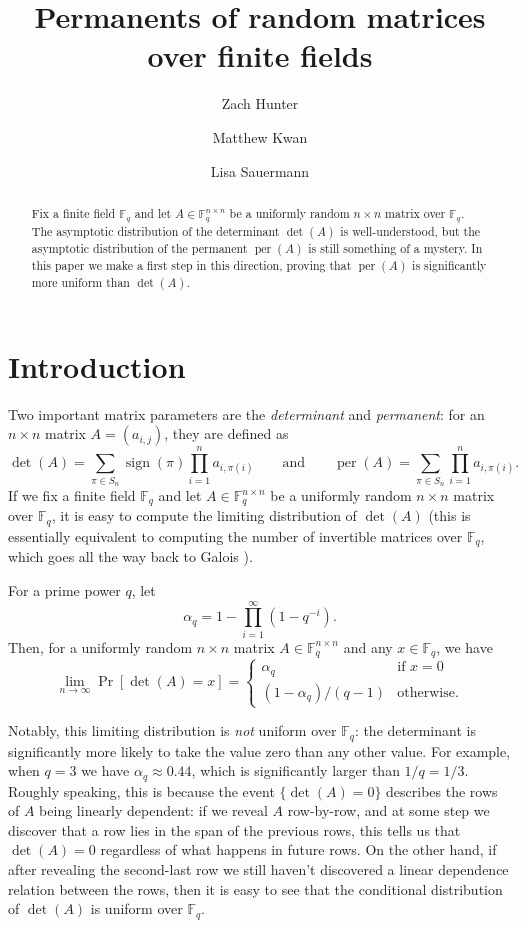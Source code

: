 \documentclass[10pt,reqno]{amsart}
\title{Permanents of random matrices over finite fields}
\author[A1]{Zach Hunter}
\author[A2]{Matthew Kwan}
\author[A3]{Lisa Sauermann}
\let\originalleft\left
\let\originalright\right
\renewcommand{\left}{\mathopen{}\mathclose\bgroup\originalleft}
\renewcommand{\right}{\aftergroup\egroup\originalright}
\numberwithin{equation}{section}
\theoremstyle{remark}
\newcommand{\mb}{\mathbb}
\newcommand{\on}{\operatorname}
\begin{document}
\begin{abstract} 
Fix a finite field $\mb F_q$ and let $A\in \mb F_q^{n\times n}$ be a uniformly random $n\times n$ matrix over $\mb F_q$. The asymptotic distribution of the determinant $\det(A)$ is well-understood, but the asymptotic distribution of the permanent $\on{per}(A)$ is still something of a mystery. In this paper we make a first step in this direction, proving that $\on{per}(A)$ is significantly more uniform than $\on{det}(A)$.
\end{abstract}

\maketitle

\section{Introduction}\label{sec:introduction}
Two important matrix parameters are the \emph{determinant}
and \emph{permanent}: for an $n\times n$ matrix $A=(a_{i,j})$, 
they are defined as
\begin{equation}
\det(A)=\sum_{\pi\in S_{n}}\operatorname{sign}(\pi)\prod_{i=1}^{n}a_{i,\pi(i)}\qquad\text{and}\qquad\operatorname{per}(A)=\sum_{\pi\in S_{n}}\prod_{i=1}^{n}a_{i,\pi(i)}.\label{eq:det-per}
\end{equation}
If we fix a finite field $\mb F_q$ and let $A\in \mb F_q^{n\times n}$ be a uniformly random $n\times n$ matrix over $\mb F_q$, it is easy to compute the limiting distribution of $\det(A)$ (this is essentially equivalent to computing the number of invertible matrices over $\mb F_q$, which goes all the way back to Galois \cite[p.\ 280]{Smith-book}).
\begin{fact}\label{fact:det}
For a prime power $q$, let 
\[
\alpha_{q}=1-\prod_{i=1}^{\infty}(1-q^{-i}).%
\]
Then, for a uniformly random $n\times n$ matrix $A\in\mathbb{F}_{q}^{n\times n}$ and any $x\in \mb F_q$, we have
\[
\lim_{n\to \infty}\Pr[\det(A)=x]=\begin{cases}
\alpha_{q} & \text{if }x=0\\
(1-\alpha_{q})/(q-1) & \text{otherwise.}
\end{cases}
\]
\end{fact}
Notably, this limiting distribution is \emph{not} uniform over $\mb F_q$: the determinant is significantly more likely to take the value zero than any other value. For example, when $q=3$ we have $\alpha_q\approx 0.44$, which is significantly larger than $1/q=1/3$. Roughly speaking, this is because the event $\{\det(A)=0\}$ describes the rows of $A$ being linearly dependent: if we reveal $A$ row-by-row, and at some step we discover that a row lies in the span of the previous rows, this tells us that $\det(A)=0$ regardless of what happens in future rows. On the other hand, if after revealing the second-last row we still haven't discovered a linear dependence relation between the rows, then it is easy to see that the conditional distribution of $\det(A)$ is uniform over $\mb F_q$.
\end{document}
